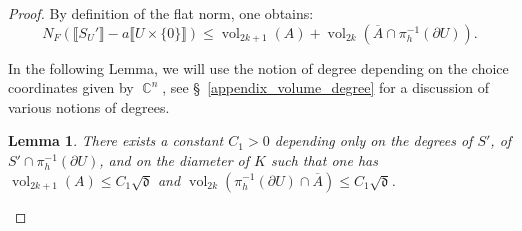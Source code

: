 \documentclass[12pt]{amsbook}%
\newtheorem{lem}[thm]{Lemma}
\theoremstyle{definition}
\theoremstyle{remark}
\numberwithin{section}{chapter}
\numberwithin{subsection}{section}
\numberwithin{figure}{chapter}
\DeclareMathOperator{\C}{\mathbb{C}}
\DeclareMathOperator{\vol}{vol}
\newcommand\bac[1]{{\color{blue} #1} }
\newcommand\intcur[1]{\llbracket #1 \rrbracket}
\def\fd{{\mathfrak{d}}}
\def\fS{{\mathfrak{S}}}
\def\kap{}
\begin{document}
{{\begin{proof}
%


By definition of the flat norm, one obtains:
\begin{equation} \label{eq_flat_norm_main}
N_F(\intcur{S_U'} - a \intcur{U\times \{0\}}) \leqslant   \vol_{2k+1} (A) + \vol_{2k}(\overline{A} \cap \pi_h^{-1}(\partial U)).
\end{equation} 

In the following Lemma, we will use the notion of degree depending on the choice coordinates given by $\C^n$, see \S~\ref{appendix_volume_degree} for a discussion of various notions of degrees. 

\begin{lem} \label{lem_two_bound} There exists a constant $C_1> 0$ depending only on the degrees of 
 ${S'}$, of ${S'} \cap \pi_h^{-1}(\partial U)$, and on the diameter of $K$  such that 
one has $\vol_{2k+1}(A) \leqslant C_1 \sqrt{\fd} $ and $\vol_{2k}(\pi_h^{-1}(\partial U) \cap \overline{A}) \leqslant C_1 \sqrt{\fd}$.
\end{lem}


\end{proof}}}
\end{document}
